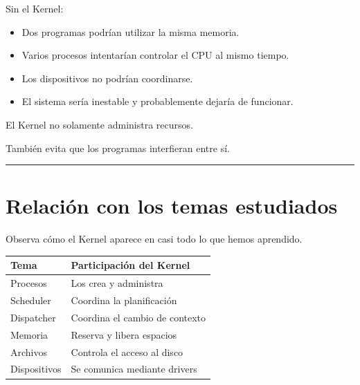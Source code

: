 \documentclass[
  spanish,
  letterpaper,
]{scrbook}
\newcounter{none} %
\providecommand{\tightlist}{%
  \setlength{\itemsep}{0pt}\setlength{\parskip}{0pt}}
\begin{document}
Sin el Kernel:

\begin{itemize}
\tightlist
\item
  Dos programas podrían utilizar la misma memoria.
\item
  Varios procesos intentarían controlar el CPU al mismo tiempo.
\item
  Los dispositivos no podrían coordinarse.
\item
  El sistema sería inestable y probablemente dejaría de funcionar.
\end{itemize}

\begin{tcolorbox}[enhanced jigsaw, arc=.35mm, bottomrule=.15mm, bottomtitle=1mm, breakable, colback=white, colbacktitle=quarto-callout-warning-color!10!white, colframe=quarto-callout-warning-color-frame, coltitle=black, left=2mm, leftrule=.75mm, opacityback=0, opacitybacktitle=0.6, rightrule=.15mm, title=\textcolor{quarto-callout-warning-color}{\faExclamationTriangle}\hspace{0.5em}{Reflexiona}, titlerule=0mm, toprule=.15mm, toptitle=1mm]

El Kernel no solamente administra recursos.

También evita que los programas interfieran entre sí.

\end{tcolorbox}

\begin{center}\rule{0.5\linewidth}{0.5pt}\end{center}


\chapter{Relación con los temas
estudiados}\label{relaciuxf3n-con-los-temas-estudiados}

Observa cómo el Kernel aparece en casi todo lo que hemos aprendido.

{\def\LTcaptype{none} %
\begin{longtable}[]{@{}ll@{}}
\toprule\noalign{}
Tema & Participación del Kernel \\
\midrule\noalign{}
\endhead
\bottomrule\noalign{}
\endlastfoot
Procesos & Los crea y administra \\
Scheduler & Coordina la planificación \\
Dispatcher & Coordina el cambio de contexto \\
Memoria & Reserva y libera espacios \\
Archivos & Controla el acceso al disco \\
Dispositivos & Se comunica mediante drivers \\
\end{longtable}
}
\end{document}
